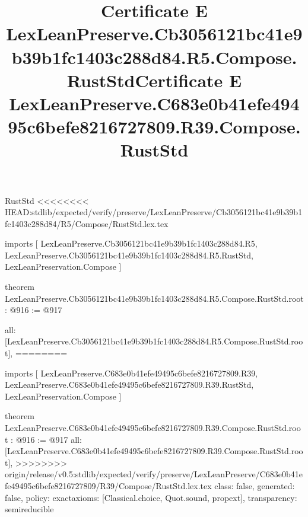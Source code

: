 \begin{lexlean}{RustStd}
<<<<<<<< HEAD:stdlib/expected/verify/preserve/LexLeanPreserve/Cb3056121bc41e9b39b1fc1403c288d84/R5/Compose/RustStd.lex.tex
\title{Certificate E LexLeanPreserve.Cb3056121bc41e9b39b1fc1403c288d84.R5.Compose.RustStd}
\begin{coremodule}
imports [
  LexLeanPreserve.Cb3056121bc41e9b39b1fc1403c288d84.R5,
  LexLeanPreserve.Cb3056121bc41e9b39b1fc1403c288d84.R5.RustStd,
  LexLeanPreservation.Compose
]

theorem LexLeanPreserve.Cb3056121bc41e9b39b1fc1403c288d84.R5.Compose.RustStd.root : @916 := @917 {
  all: [LexLeanPreserve.Cb3056121bc41e9b39b1fc1403c288d84.R5.Compose.RustStd.root],
========
\title{Certificate E LexLeanPreserve.C683e0b41efe49495c6befe8216727809.R39.Compose.RustStd}
\begin{coremodule}
imports [
  LexLeanPreserve.C683e0b41efe49495c6befe8216727809.R39,
  LexLeanPreserve.C683e0b41efe49495c6befe8216727809.R39.RustStd,
  LexLeanPreservation.Compose
]

theorem LexLeanPreserve.C683e0b41efe49495c6befe8216727809.R39.Compose.RustStd.root : @916 := @917 {
  all: [LexLeanPreserve.C683e0b41efe49495c6befe8216727809.R39.Compose.RustStd.root],
>>>>>>>> origin/release/v0.5:stdlib/expected/verify/preserve/LexLeanPreserve/C683e0b41efe49495c6befe8216727809/R39/Compose/RustStd.lex.tex
  class: false,
  generated: false,
  policy: exact{axioms: [Classical.choice, Quot.sound, propext]},
  transparency: semireducible
}


\end{coremodule}}
\end{coremodule}
\end{lexlean}
